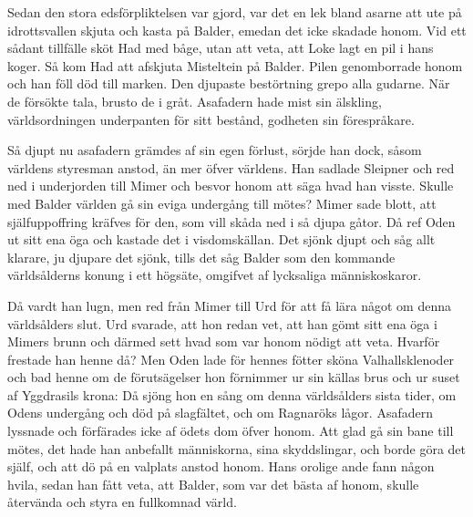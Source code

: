 Sedan den stora edsförpliktelsen var gjord, var det en lek bland asarne
att ute på idrottsvallen skjuta och kasta på Balder, emedan det icke
skadade honom. Vid ett sådant tillfälle sköt Had med båge, utan att
veta, att Loke lagt en pil i hans koger. Så kom Had att afskjuta
Misteltein på Balder. Pilen genomborrade honom och han föll död till
marken. Den djupaste bestörtning grepo alla gudarne. När de försökte
tala, brusto de i gråt. Asafadern hade mist sin älskling,
världsordningen underpanten för sitt bestånd, godheten sin förespråkare.

Så djupt nu asafadern grämdes af sin egen förlust, sörjde
\protect\hypertarget{lb1625905.xhtmlux5cux23start88}{}{}\protect\hypertarget{lb1625905.xhtmlux5cux23start88-a}{}{}\protect\hypertarget{lb1625905.xhtmlux5cux23start88-b}{}{}\protect\hypertarget{lb1625905.xhtmlux5cux23start88-c}{}{}\protect\hypertarget{lb1625905.xhtmlux5cux23start88-d}{}{}
han dock, såsom världens styresman anstod, än mer öfver världens. Han
sadlade Sleipner och red ned i underjorden till Mimer och besvor honom
att säga hvad han visste. Skulle med Balder världen gå sin eviga
undergång till mötes? Mimer sade blott, att själfuppoffring kräfves för
den, som vill skåda ned i så djupa gåtor. Då ref Oden ut sitt ena öga
och kastade det i visdomskällan. Det sjönk djupt och såg allt klarare,
ju djupare det sjönk, tills det såg Balder som den kommande
världsålderns konung i ett högsäte, omgifvet af lycksaliga
människoskaror.

Då vardt han lugn, men red från Mimer till Urd för att få lära något om
denna världsålders slut. Urd svarade, att hon redan vet, att han gömt
sitt ena öga i Mimers brunn och därmed sett hvad som var honom nödigt
att veta. Hvarför frestade han henne då? Men Oden lade för hennes fötter
sköna Valhallsklenoder och bad henne om de förutsägelser hon förnimmer
ur sin källas brus och ur suset af Yggdrasils krona: Då sjöng hon en
sång om denna världsålders sista tider, om Odens undergång och död på
slagfältet, och om Ragnaröks lågor. Asafadern lyssnade och förfärades
icke af ödets dom öfver honom. Att glad gå sin bane till mötes, det hade
han anbefallt människorna, sina skyddslingar, och borde göra det själf,
och att dö på en valplats anstod honom. Hans orolige ande fann någon
hvila, sedan han fått veta, att Balder, som var det bästa af honom,
skulle återvända och styra en fullkomnad värld.

